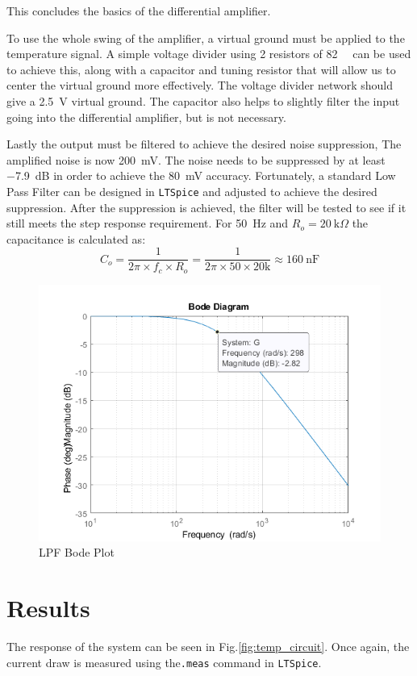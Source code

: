 This concludes the basics of the differential amplifier. \par To use the whole swing of the amplifier, a virtual ground must be applied to the temperature signal. A simple voltage divider using 2 resistors of \SI{82}{\kilo\Omega} can be used to achieve this, along with a capacitor and tuning resistor that will allow us to center the virtual ground more effectively. The voltage divider network should give a \SI{2.5}{\volt} virtual ground. The capacitor also helps to slightly filter the input going into the differential amplifier, but is not necessary.\par
Lastly the output must be filtered to achieve the desired noise suppression, The amplified noise is now \SI{200}{\milli\volt}. The noise needs to be suppressed by at least \SI{-7.9}{\dB} in order to achieve the \SI{80}{\milli\volt} accuracy. Fortunately, a standard Low Pass Filter can be designed in \texttt{LTSpice} and adjusted to achieve the desired suppression. After the suppression is achieved, the filter will be tested to see if it still meets the step response requirement. For \SI{50}{\hertz} and $R_o = \SI{20}{\kilo\Omega}$ the capacitance is calculated as: 
\[C_o = \frac{1}{2\pi\times f_c \times R_o}=\frac{1}{2\pi \times 50 \times 20\si{\kilo}}\approx \SI{160}{\nano\farad}\]

\begin{figure}[H]
    \centering
    \includegraphics[width=0.7\linewidth]{./Figures/Pictures/LPFMatlab.png}
    \caption{LPF Bode Plot}
    \label{fig:lpf_bode}
\end{figure}
\newpage
\section{Results} \label{sec:temp_results_ch3}
The response of the system can be seen in Fig.\ref{fig:temp_circuit}. Once again, the current draw is measured using the\texttt{.meas} command in \texttt{LTSpice}.

